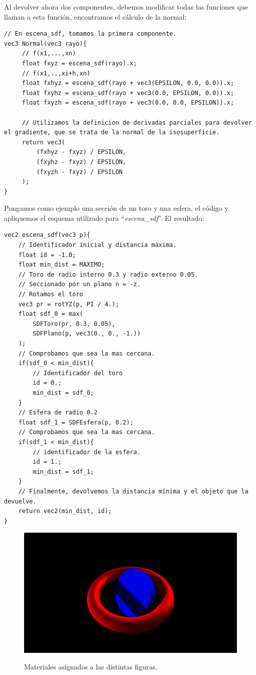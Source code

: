 Al devolver ahora dos componentes, debemos modificar todas las funciones que llaman a esta función, encontramos el cálculo de la normal:

\begin{lstlisting}
// En escena_sdf, tomamos la primera componente.
vec3 Normal(vec3 rayo){
     // f(x1,...,xn)
     float fxyz = escena_sdf(rayo).x;
     // f(x1,..,xi+h,xn)
     float fxhyz = escena_sdf(rayo + vec3(EPSILON, 0.0, 0.0)).x;
     float fxyhz = escena_sdf(rayo + vec3(0.0, EPSILON, 0.0)).x;
     float fxyzh = escena_sdf(rayo + vec3(0.0, 0.0, EPSILON)).x;
     
     // Utilizamos la definicion de derivadas parciales para devolver el gradiente, que se trata de la normal de la isosuperficie.
     return vec3(
         (fxhyz - fxyz) / EPSILON,
         (fxyhz - fxyz) / EPSILON,
         (fxyzh - fxyz) / EPSILON
     );
}
\end{lstlisting}

Pongamos como ejemplo una sección de un toro y una esfera, el código y apliquemos el esquema utilizado para \enquote{\textit{escena\_sdf}}. El resultado:

\begin{lstlisting}
vec2 escena_sdf(vec3 p){
    // Identificador inicial y distancia máxima.
    float id = -1.0;
    float min_dist = MAXIMO;
    // Toro de radio interno 0.3 y radio externo 0.05.
    // Seccionado por un plano n = -z.
    // Rotamos el toro 
    vec3 pr = rotYZ(p, PI / 4.);
    float sdf_0 = max(
        SDFToro(pr, 0.3, 0.05),
        SDFPlano(p, vec3(0., 0., -1.))
    );
    // Comprobamos que sea la mas cercana.
    if(sdf_0 < min_dist){
        // Identificador del toro
        id = 0.;
        min_dist = sdf_0;
    }
    // Esfera de radio 0.2
    float sdf_1 = SDFEsfera(p, 0.2);
    // Comprobamos que sea la mas cercana.
    if(sdf_1 < min_dist){
        // identificador de la esfera.
        id = 1.;
        min_dist = sdf_1;
    }
    // Finalmente, devolvemos la distancia mínima y el objeto que la devuelve.
    return vec2(min_dist, id);
}
\end{lstlisting}


\begin{figure}[H]
  \centering
  \captionsetup{justification=centering}%
  \includegraphics[width=1.0\textwidth]{secciones/imagenes/material/materiales.png}\label{fig:material}
  \caption{Materiales asignados a las distintas figuras.}
\end{figure}